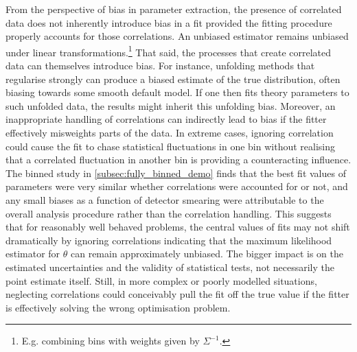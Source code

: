     From the perspective of bias in parameter extraction, the presence of correlated data does not inherently introduce bias in a fit provided the fitting procedure properly accounts for those correlations.
    An unbiased estimator remains unbiased under linear transformations.\footnote{E.g. combining bins with weights given by $\Sigma^{-1}$.}
    That said, the processes that create correlated data can themselves introduce bias.
    For instance, unfolding methods that regularise strongly can produce a biased estimate of the true distribution, often biasing towards some smooth default model.
    If one then fits theory parameters to such unfolded data, the results might inherit this unfolding bias.
    Moreover, an inappropriate handling of correlations can indirectly lead to bias if the fitter effectively misweights parts of the data.
    In extreme cases, ignoring correlation could cause the fit to chase statistical fluctuations in one bin without realising that a correlated fluctuation in another bin is providing a counteracting influence.
    The binned study in \cref{subsec:fully_binned_demo} finds that the best fit values of parameters were very similar whether correlations were accounted for or not, and any small biases as a function of detector smearing were attributable to the overall analysis procedure rather than the correlation handling.
    This suggests that for reasonably well behaved problems, the central values of fits may not shift dramatically by ignoring correlations indicating that the maximum likelihood estimator for $\theta$ can remain approximately unbiased.
    The bigger impact is on the estimated uncertainties and the validity of statistical tests, not necessarily the point estimate itself.
    Still, in more complex or poorly modelled situations, neglecting correlations could conceivably pull the fit off the true value if the fitter is effectively solving the wrong optimisation problem.

